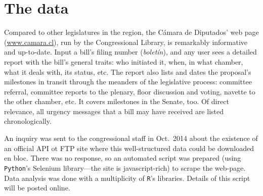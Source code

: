 \documentclass[letter,12pt]{article}
\begin{document}
\section{The data}

Compared to other legislatures in the region, the C\'amara de Diputados' web page (\url{www.camara.cl}), run by the Congressional Library, is remarkably informative and up-to-date. Input a bill's filing number (\emph{boletín}), and any user sees a detailed report with the bill's general traits: who initiated it, when, in what chamber, what it deals with, its status, etc. The report also lists and dates the proposal's milestones in transit through the meanders of the legislative process: committee referral, committee reports to the plenary, floor discussion and voting, navette to the other chamber, etc. It covers milestones in the Senate, too. Of direct relevance, all urgency messages that a bill may have received are listed chronologically. 

An inquiry was sent to the congressional staff in Oct.\ 2014 about the existence of an official API ot FTP site where this well-structured data could be downloaded en bloc. There was no response, so an automated script was prepared (using \texttt{Python}'s Selenium library---the site is javascript-rich) to scrape the web-page. Data analysis was done with a multiplicity of \texttt{R}'s libraries. Details of this script will be posted online. 
\end{document}

